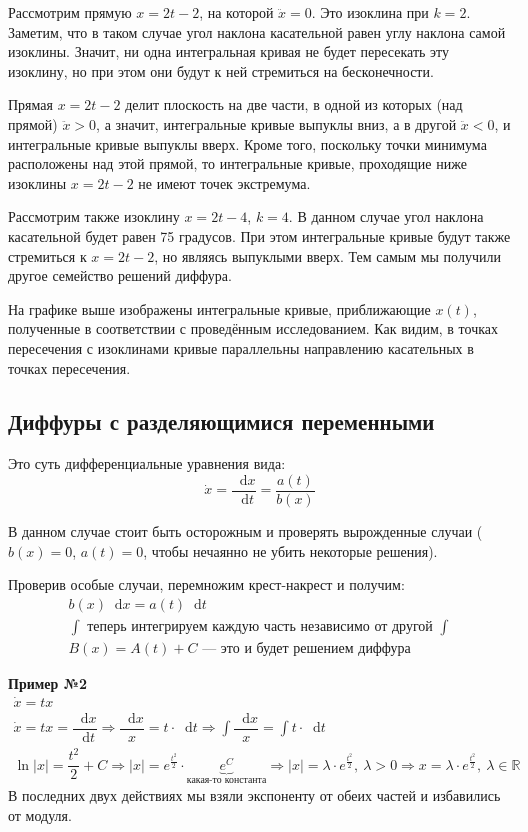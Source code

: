 \documentclass[a4paper,12pt]{article}
\newcommand{\R}{\mathbb{R}}
\renewcommand*\d{\mathop{}\!\mathrm{d}}
\newcommand{\dx}{\dot{x}}
\newcommand{\ddx}{\ddot{x}}
\newcommand{\ds}{\displaystyle}
\begin{document}
Рассмотрим прямую $x = 2t - 2$, на которой $\ddx = 0$. Это изоклина при $k = 2$. Заметим, что в таком случае угол наклона касательной равен углу наклона самой изоклины. Значит, ни одна интегральная кривая не будет пересекать эту изоклину, но при этом они будут к ней стремиться на бесконечности.

Прямая $x = 2t - 2$ делит плоскость на две части, в одной из которых (над прямой) $\ddx > 0$, а значит, интегральные кривые выпуклы вниз, а в другой $\ddx < 0$, и интегральные кривые выпуклы вверх. Кроме того, поскольку точки минимума расположены над этой прямой, то интегральные кривые, проходящие ниже изоклины $x = 2t - 2$ не имеют точек экстремума. 

Рассмотрим также изоклину $x = 2t - 4$, $ k = 4$. В данном случае угол наклона касательной будет равен 75 градусов. При этом интегральные кривые будут также стремиться к $x = 2t - 2$, но являясь выпуклыми вверх. Тем самым мы получили другое семейство решений диффура.

На графике выше изображены интегральные кривые, приближающие $x(t)$, полученные в соответствии с проведённым исследованием. Как видим, в точках пересечения с изоклинами кривые параллельны направлению касательных в точках пересечения.


\subsection{Диффуры с разделяющимися переменными}

Это суть дифференциальные уравнения вида:
\[\dx = \dfrac{\d x}{\d t} = \dfrac{a(t)}{b(x)}\]

В данном случае стоит быть осторожным и проверять вырожденные случаи ($b(x) = 0$, $a(t) = 0$, чтобы нечаянно не убить некоторые решения).

Проверив особые случаи, перемножим крест-накрест и получим:
\begin{gather*}
	b(x)\d x = a(t)\d t \\
	\ds\int \text{ теперь интегрируем каждую часть независимо от другой } \ds\int\\
	B(x) = A(t) + C \text{ --- это и будет решением диффура}
\end{gather*}

\textbf{Пример №2}
\begin{gather*}
	\dx = tx \\
	\dx= tx = \dfrac{\d x}{\d t} \Longrightarrow \dfrac{\d x}{x} = t \cdot \d t \Longrightarrow \ds \int\dfrac{\d x}{x}=\int t \cdot \d t \\
	\ln |x| = \dfrac{t^2}{2} + C \Longrightarrow |x| = e^{\frac{t^2}{2}} \cdot \underbrace{e^C}_{\text{какая-то константа}} \Longrightarrow |x| = \lambda \cdot e^{\frac{t^2}{2}},\ \lambda > 0 \Longrightarrow x = \lambda \cdot e^{\frac{t^2}{2}},\ \lambda \in \R
\end{gather*}
В последних двух действиях мы взяли экспоненту от обеих частей и избавились от модуля.
\end{document}
